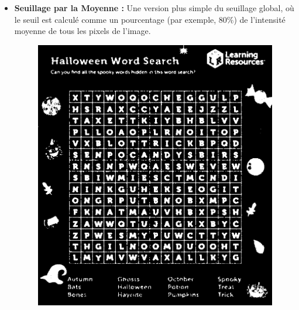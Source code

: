 \documentclass{article}
\begin{document}
\begin{itemize}
    \item \textbf{Seuillage par la Moyenne :} Une version plus simple du seuillage global, où le seuil est calculé comme un pourcentage (par exemple, 80\%) de l'intensité moyenne de tous les pixels de l'image.
    \begin{figure}[H]
      \centering
          \includegraphics[width=\linewidth]{ressources/image_2_word_detection_05_mean_threshold.png}
          \caption{}
        \endminipage\quad\quad\quad\quad

\end{figure}
\end{itemize}
\end{document}
